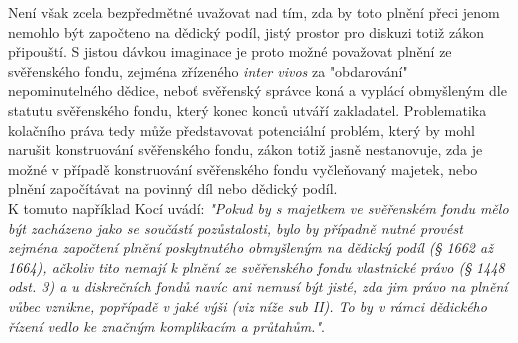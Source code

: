 \documentclass{article}
\begin{document}
Není však zcela bezpředmětné uvažovat nad tím, zda by toto plnění přeci jenom nemohlo být započteno na dědický podíl, jistý prostor pro diskuzi totiž zákon připouští. S jistou dávkou imaginace je proto možné považovat plnění ze svěřenského fondu, zejména zřízeného \textit{inter vivos} za "obdarování" nepominutelného dědice, neboť svěřenský správce koná a vyplácí obmyšleným dle statutu svěřenského fondu, který konec konců utváří zakladatel. Problematika kolačního práva tedy může představovat potenciální problém, který by mohl narušit konstruování svěřenského fondu, zákon totiž jasně nestanovuje, zda je možné v případě konstruování svěřenského fondu vyčleňovaný majetek, nebo plnění započítávat na povinný díl nebo dědický podíl.\\

K tomuto například Kocí uvádí: \textit{"Pokud by s majetkem ve svěřenském fondu mělo být zacházeno jako se součástí pozůstalosti, bylo by případně nutné provést zejména započtení plnění poskytnutého obmyšleným na dědický podíl (§ 1662 až 1664), ačkoliv tito nemají k plnění ze svěřenského fondu vlastnické právo (§ 1448 odst. 3) a u diskrečních fondů navíc ani nemusí být jisté, zda jim právo na plnění vůbec vznikne, popřípadě v jaké výši (viz níže sub II). To by v rámci dědického řízení vedlo ke značným komplikacím a průtahům."}.



\end{document}

